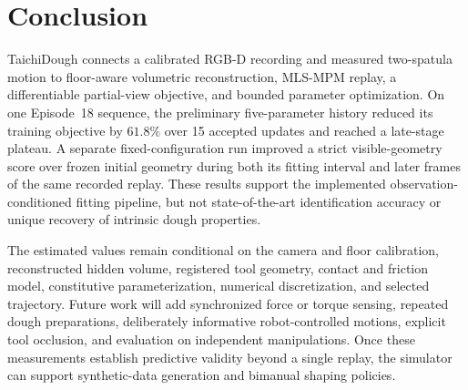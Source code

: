 \section{Conclusion}
\label{sec:conclusion}

TaichiDough connects a calibrated RGB-D recording and measured two-spatula motion to floor-aware volumetric reconstruction, MLS-MPM replay, a differentiable partial-view objective, and bounded parameter optimization. On one Episode~18 sequence, the preliminary five-parameter history reduced its training objective by $61.8\%$ over 15 accepted updates and reached a late-stage plateau. A separate fixed-configuration run improved a strict visible-geometry score over frozen initial geometry during both its fitting interval and later frames of the same recorded replay. These results support the implemented observation-conditioned fitting pipeline, but not state-of-the-art identification accuracy or unique recovery of intrinsic dough properties.

The estimated values remain conditional on the camera and floor calibration, reconstructed hidden volume, registered tool geometry, contact and friction model, constitutive parameterization, numerical discretization, and selected trajectory. Future work will add synchronized force or torque sensing, repeated dough preparations, deliberately informative robot-controlled motions, explicit tool occlusion, and evaluation on independent manipulations. Once these measurements establish predictive validity beyond a single replay, the simulator can support synthetic-data generation and bimanual shaping policies.
